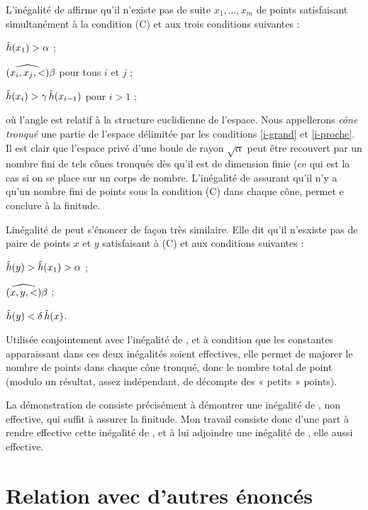 \documentclass[a4paper, 11pt]{article}
\begin{document}
L'inégalité de  affirme qu'il n'existe pas de suite $x_1, \dots,
x_m$ de points satisfaisant simultanément à la condition (C) et aux trois
conditions suivantes :
\begin{enumthm}
  \item $\mathop{\smash{\hat h}}(x_1) > \alpha$ ; \label{i-grand}
  \item $\widehat{(x_i, x_j,<)} \beta$ pour tous $i$ et $j$ ; \label{i-proche}
  \item $\mathop{\smash{\hat h}}(x_i) > \gamma \mathop{\smash{\hat h}}(x_{i-1})$ pour $i > 1$ ; 
\end{enumthm}
où l'angle est relatif à la structure euclidienne de l'espace. Nous
appellerons \emph{cône tronqué} une partie de l'espace délimitée par les
conditions \ref{i-grand} et \ref{i-proche}. Il est clair que l'espace privé
d'une boule de rayon $\sqrt{\alpha}$ peut être recouvert par un nombre fini de
tels cônes tronqués dès qu'il est de dimension finie (ce qui est la cas si on
se place sur un corps de nombre. L'inégalité de  assurant qu'il n'y
a qu'un nombre fini de points sous la condition (C) dans chaque cône, permet e
conclure à la finitude.

Linégalité de  peut s'énoncer de façon très similaire. Elle dit
qu'il n'esxiste pas de paire de points $x$ et $y$ satisfaisant à (C) et aux
conditions suivantes :
\begin{enumthm}
  \item $\mathop{\smash{\hat h}}(y) > \mathop{\smash{\hat h}}(x_1) > \alpha$ ; 
  \item $\widehat{(x, y,<)} \beta$ ;
  \item $\mathop{\smash{\hat h}}(y) < \delta \mathop{\smash{\hat h}}(x)$.
\end{enumthm}
Utilisée conjointement avec l'inégalité de , et à condition que les
constantes apparaissant dans ces deux inégalités soient effectives, elle
permet de majorer le nombre de points dans chaque cône tronqué, donc le nombre
total de point (modulo un résultat, assez indépendant, de décompte des «
petits » points).

La démonstration de  consiste précisément à démontrer une
inégalité de , non effective, qui suffit à assurer la finitude. Mon
travail consiste donc d'une part à rendre effective cette inégalité de
, et à lui adjoindre une inégalité de , elle aussi
effective.

\section{Relation avec d'autres énoncés}
\end{document}
